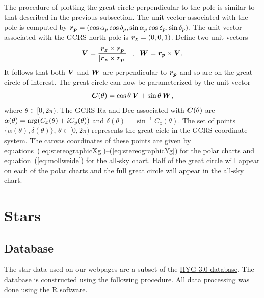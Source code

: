 \documentclass[12pt]{article}
\newcommand \beq {\begin{equation}}
\newcommand \eeq {\end{equation}}
\newcommand{\ve}[1]{\mbox{\boldmath $#1$}}
\begin{document}
The procedure of plotting the great circle perpendicular to the pole is similar 
to that described in the previous subsection. 
The unit vector associated with the pole is computed by 
$\ve{r_p} = (\cos \alpha_p \cos \delta_p, \sin \alpha_p \cos \delta_p, \sin \delta_p)$. 
The unit vector associated with the GCRS north pole is $\ve{r_z}=(0,0,1)$. 
Define two unit vectors 
\beq
  \ve{V} = \frac{\ve{r_z}\times \ve{r_p}}{|\ve{r_z}\times \ve{r_p}|} \ \ , \ \
  \ve{W} = \ve{r_p} \times \ve{V} .
\eeq
It follows that both $\ve{V}$ and $\ve{W}$ are perpendicular to $\ve{r_p}$ and so 
are on the great circle of interest. The great circle can now be parameterized 
by the unit vector 
\beq
  \ve{C}(\theta) = \cos \theta \, \ve{V} + \sin \theta \, \ve{W} ,
\eeq
where $\theta \in [0,2\pi)$. The GCRS Ra and Dec associated with $\ve{C}(\theta)$ are 
$\alpha(\theta) = {\rm arg}(C_x(\theta) + i C_y(\theta))$ and 
$\delta(\theta) = \sin^{-1} C_z(\theta)$. The set of points 
$\{ \alpha(\theta), \delta(\theta) \}$,
$\theta \in [0,2\pi)$ represents the great cicle in the GCRS coordinate
system. The canvas coordinates of these points are given by 
equations~(\ref{eq:stereographicXg})--(\ref{eq:stereographicYg}) for the polar charts and 
equation~(\ref{eq:mollweide}) for the all-sky chart. 
Half of the great circle will appear 
on each of the polar charts and the full great circle will appear  
in the all-sky chart. 

\section{Stars}

\subsection{Database}

The star data used on our webpages are a subset of the \href{http://astronexus.com/node/34}
{HYG 3.0 database}. The database is constructed using the following procedure. 
All data processing was done using the \href{https://www.r-project.org/}{R software}.
\end{document}
